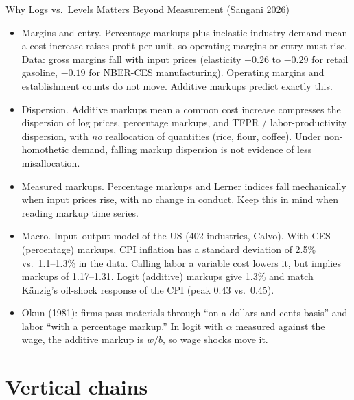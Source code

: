\documentclass[aspectratio=169,10pt]{beamer}
\begin{document}
\begin{frame}{Why Logs vs.\ Levels Matters Beyond Measurement (Sangani 2026)}
\footnotesize
\begin{itemize}
\item \alert{Margins and entry.} Percentage markups plus inelastic industry demand mean a cost increase raises profit per unit, so operating margins or entry must rise. Data: gross margins \alert{fall} with input prices (elasticity $-0.26$ to $-0.29$ for retail gasoline, $-0.19$ for NBER-CES manufacturing). Operating margins and establishment counts do not move. Additive markups predict exactly this.
\item \alert{Dispersion.} Additive markups mean a common cost increase compresses the dispersion of log prices, percentage markups, and TFPR / labor-productivity dispersion, with \emph{no} reallocation of quantities (rice, flour, coffee). Under non-homothetic demand, falling markup dispersion is not evidence of less misallocation.
\item \alert{Measured markups.} Percentage markups and Lerner indices fall mechanically when input prices rise, with no change in conduct. Keep this in mind when reading markup time series.
\item \alert{Macro.} Input--output model of the US (402 industries, Calvo). With CES (percentage) markups, CPI inflation has a standard deviation of 2.5\% vs.\ 1.1--1.3\% in the data. Calling labor a variable cost lowers it, but implies markups of 1.17--1.31. Logit (additive) markups give 1.3\% and match Känzig's oil-shock response of the CPI (peak 0.43 vs.\ 0.45).
\item \alert{Okun (1981)}: firms pass materials through ``on a dollars-and-cents basis'' and labor ``with a percentage markup.'' In logit with $\alpha$ measured against the wage, the additive markup is $w/b$, so wage shocks move it.
\end{itemize}
\end{frame}


\section{Vertical chains}
\end{document}
